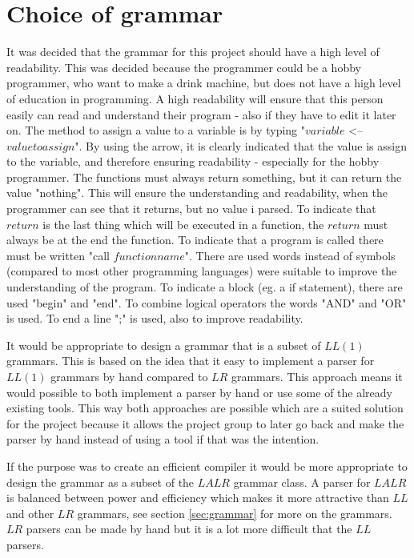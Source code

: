 \section{Choice of grammar}
It was decided that the grammar for this project should have a high level of readability. This was decided because the programmer could be a hobby programmer, who want to make a drink machine, but does not have a high level of education in programming. A high readability will ensure that this person easily can read and understand their program - also if they have to edit it later on. The method to assign a value to a variable is by typing "$variable$ <-- $value to assign$". By using the arrow, it is clearly indicated that the value is assign to the variable, and therefore ensuring readability - especially for the hobby programmer.
The functions must always return something, but it can return the value "nothing". This will ensure the understanding and readability, when the programmer can see that it returns, but no value i parsed. To indicate that $return$ is the last thing which will be executed in a function, the $return$ must always be at the end the function. To indicate that a program is called there must be written "call $functionname$".
There are used words instead of symbols (compared to most other programming languages) were suitable to improve the understanding of the program. To indicate a block (eg. a if statement), there are used "begin" and "end". To combine logical operators the words "AND" and "OR" is used. To end a line ";" is used, also to improve readability.

It would be appropriate to design a grammar that is a subset of $LL(1)$ grammars. This is based on the idea that it easy to implement a parser for $LL(1)$ grammars by hand compared to $LR$ grammars. This approach means it would possible to both implement a parser by hand or use some of the already existing tools. This way both approaches are possible which are a suited solution for the project because it allows the project group to later go back and make the parser by hand instead of using a tool if that was the intention.

If the purpose was to create an efficient compiler it would be more appropriate to design the grammar as a subset of the $LALR$ grammar class. A parser for $LALR$ is balanced between power and efficiency which makes it more attractive than $LL$ and other $LR$ grammars, see section \ref{sec:grammar} for more on the grammars. $LR$ parsers can be made by hand but it is a lot more difficult that the $LL$ parsers.